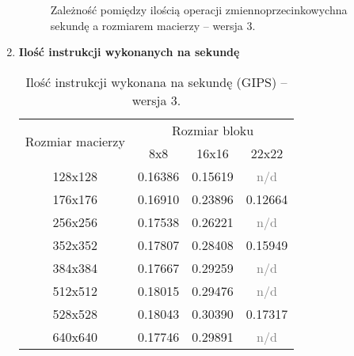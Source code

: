 \begin{enumerate}
\begin{figure}[H]
%
\caption{Zależność pomiędzy ilością operacji zmiennoprzecinkowychna sekundę a rozmiarem macierzy -- wersja 3.}
\end{figure}

\item \textbf{Ilość instrukcji wykonanych na sekundę} \newline

\begin{table}[H]
\centering
\begin{tabular}{|c|c|c|c|}
\hline
\multirow{2}{*}{Rozmiar macierzy} & \multicolumn{3}{c|}{Rozmiar bloku} \\ \cline{2-4}
& 8x8 & 16x16 & 22x22 \\ \hline
128x128 & 0.16386 & 0.15619 & \textcolor{gray}{n/d}\\ \hline
176x176 & 0.16910 & 0.23896 & 0.12664 \\ \hline
256x256 & 0.17538 & 0.26221 & \textcolor{gray}{n/d} \\ \hline
352x352 & 0.17807 & 0.28408 & 0.15949 \\ \hline
384x384 & 0.17667 & 0.29259 & \textcolor{gray}{n/d} \\ \hline
512x512 & 0.18015 & 0.29476 & \textcolor{gray}{n/d} \\ \hline
528x528 & 0.18043 & 0.30390 & 0.17317 \\ \hline
640x640 & 0.17746 & 0.29891 & \textcolor{gray}{n/d} \\ \hline
\end{tabular}
\caption{Ilość instrukcji wykonana na sekundę (GIPS) -- wersja 3.}
\end{table}

\begin{figure}[H]
\centering
\end{figure}
\end{enumerate}
